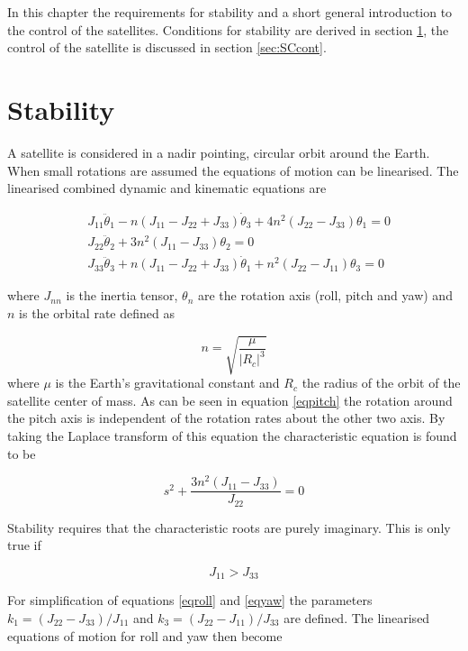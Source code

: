 In this chapter the requirements for stability and a short general introduction to the control of the satellites. Conditions for stability are derived in section \ref{sec:SCstab}, the control of the satellite is discussed in section \ref{sec:SCcont}.

\section{Stability}
\label{sec:SCstab}
A satellite is considered in a nadir pointing, circular orbit around the Earth. When small rotations are assumed the equations of motion can be linearised. The linearised combined dynamic and kinematic equations are

\begin{eqnarray}
&J_{11} \ddot{\theta}_1 - n\left(J_{11}-J_{22}+J_{33}\right) \dot{\theta}_3+ 4n^2\left(J_{22}-J_{33}\right)\theta _1= 0 \label{eqroll} \\
&J_{22} \ddot{\theta}_2 + 3n^2\left(J_{11}-J_{33}\right)\theta_2= 0 \label{eqpitch} \\
&J_{33} \ddot{\theta}_3 + n\left(J_{11}-J_{22}+J_{33}\right) \dot{\theta}_1 + n^2\left(J_{22}-J_{11}\right)\theta _3= 0 \label{eqyaw}
\end{eqnarray}

where $J_{nn}$ is the inertia tensor, $\theta_n$ are the rotation axis (roll, pitch and yaw) and $n$ is the orbital rate defined as 

\begin{equation}
n=\sqrt{\frac{\mu}{|R_c|^3}}
\label{orbrate}
\end{equation}
where $\mu$ is the Earth's gravitational constant and $R_c$ the radius of the orbit of the satellite center of mass. As can be seen in equation \ref{eqpitch} the rotation around the pitch axis is independent of the rotation rates about the other two axis. By taking the Laplace transform of this equation the characteristic equation is found to be

\begin{equation}
s^2+\frac{3n^2\left(J_{11}-J_{33}\right)}{J_{22}} = 0 
\label{lappitch}
\end{equation}

Stability requires that the characteristic roots are purely imaginary. This is only true if 

\begin{equation}
J_{11}>J_{33}
\label{Js1}
\end{equation}

For simplification of equations \ref{eqroll} and \ref{eqyaw} the parameters $k_1 = (J_{22}-J_{33})/J_{11}$ and $k_3 = (J_{22}-J_{11})/J_{33}$ are defined. The linearised equations of motion for roll and yaw then become

